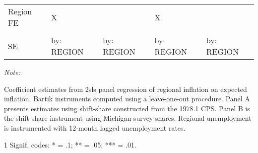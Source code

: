 \begin{table}[!htbp]
\begin{threeparttable}
\begin{tabular}{lllll}
\addlinespace
Region FE & X &  & X & \\
\cellcolor{gray!10}{Time FE} & \cellcolor{gray!10}{X} & \cellcolor{gray!10}{} & \cellcolor{gray!10}{} & \cellcolor{gray!10}{X}\\
SE & by: REGION & by: REGION & by: REGION & by: REGION\\
\bottomrule
\end{tabular}
\begin{tablenotes}
\item \textit{Note: } 
\item Coefficient estimates from 2sls panel regression of regional inflation on expected inflation. Bartik instruments computed using a leave-one-out procedure. Panel A presents estimates using shift-share constructed from the 1978.1 CPS. Panel B is the shift-share instrument using Michigan survey shares. Regional unemployment is instrumented with 12-month lagged unemployment rates.
\item[1] Signif. codes: * = .1; ** = .05; *** = .01.
\end{tablenotes}
\end{threeparttable}\end{table}

